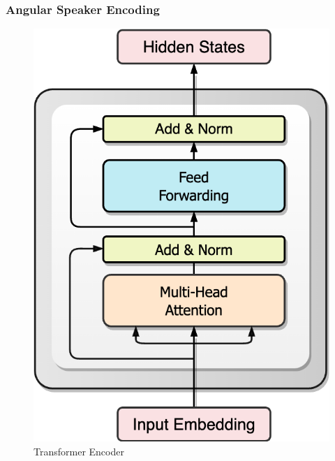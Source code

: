 \documentclass{article}
\begin{document}
\subsubsection{Angular Speaker Encoding}


\begin{figure}[ht]
  \begin{minipage}[b]{0.33\textwidth}
    \centering
    \includegraphics[width=0.73\linewidth]{pics/TransformerEncoder.drawio.png}
    \caption{Transformer Encoder}
    \label{fig:subim1}
  \end{minipage}
  \begin{minipage}[b]{0.33\textwidth}
    \centering

\end{minipage}
\end{figure}
\end{document}
